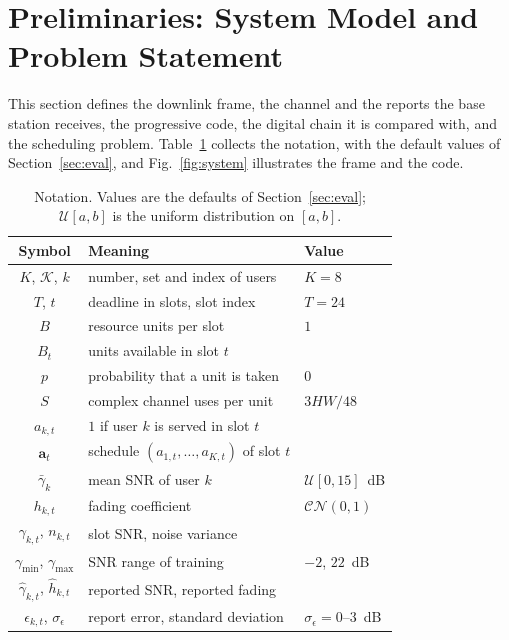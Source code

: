 \section{Preliminaries: System Model and Problem Statement}
\label{sec:system}

This section defines the downlink frame, the channel and the reports the base station receives,
the progressive code, the digital chain it is compared with, and the scheduling problem.
Table~\ref{tab:notation} collects the notation, with the default values of
Section~\ref{sec:eval}, and Fig.~\ref{fig:system} illustrates the frame and the code.

\begin{table}[!t]
\caption{Notation. Values are the defaults of Section~\ref{sec:eval};
$\mathcal{U}[a, b]$ is the uniform distribution on $[a, b]$.}
\label{tab:notation}
\centering
\footnotesize
\setlength{\tabcolsep}{4pt}
\renewcommand{\arraystretch}{1.1}
\begin{tabular}{|c|>{\raggedright\arraybackslash}p{4.45cm}|>{\raggedright\arraybackslash}p{1.75cm}|}
\hline
Symbol & Meaning & Value \\
\hline
$K$, $\mathcal{K}$, $k$ & number, set and index of users & $K = 8$ \\
$T$, $t$ & deadline in slots, slot index & $T = 24$ \\
$B$ & resource units per slot & $1$ \\
$B_t$ & units available in slot $t$ & \\
$p$ & probability that a unit is taken & $0$ \\
$S$ & complex channel uses per unit & $3HW/48$ \\
$a_{k,t}$ & $1$ if user $k$ is served in slot $t$ & \\
$\mathbf{a}_t$ & schedule $(a_{1,t}, \dots, a_{K,t})$ of slot $t$ & \\
\hline
$\bar\gamma_k$ & mean SNR of user $k$ & $\mathcal{U}[0, 15]$~dB \\
$h_{k,t}$ & fading coefficient & $\mathcal{CN}(0,1)$ \\
$\gamma_{k,t}$, $n_{k,t}$ & slot SNR, noise variance & \\
$\gamma_{\min}$, $\gamma_{\max}$ & SNR range of training & $-2$, $22$~dB \\
$\hat\gamma_{k,t}$, $\hat h_{k,t}$ & reported SNR, reported fading & \\
$\epsilon_{k,t}$, $\sigma_\epsilon$ & report error, standard deviation & $\sigma_\epsilon = 0$--$3$~dB \\

\end{tabular}
\end{table}
